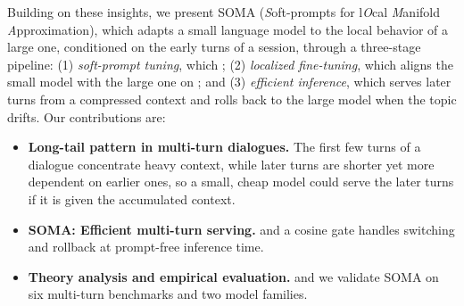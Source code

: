 Building on these insights, we present SOMA (\textit{S}oft-prompts for l\textit{O}cal \textit{M}anifold \textit{A}pproximation), which adapts a small language model to the local behavior of a large one, conditioned on the early turns of a session, through a three-stage pipeline: (1) \textit{soft-prompt tuning}, which ; (2) \textit{localized fine-tuning}, which aligns the small model with the large one on ; and (3) \textit{efficient inference}, which serves later turns from a compressed context and rolls back to the large model when the topic drifts. Our contributions are: 
\begin{itemize}[left=0pt,itemsep=2pt]
\item \textbf{Long-tail pattern in multi-turn dialogues.} 
The first few turns of a dialogue concentrate heavy context, while later turns are shorter yet more dependent on earlier ones, so a small, cheap model could serve the later turns if it is given the accumulated context.



\item \textbf{SOMA: Efficient multi-turn serving.}  and a cosine gate handles switching and rollback at prompt-free inference time.

\item \textbf{Theory analysis and empirical evaluation.} 
 and we validate SOMA on six multi-turn benchmarks and two model families.
\end{itemize}


